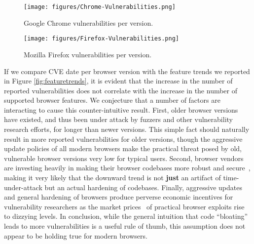 \begin{figure}[ht]
    \centering
    \texttt{[image: figures/Chrome-Vulnerabilities.png]}
    \caption{Google Chrome vulnerabilities per version.}
    \label{fig:chrome-vuln}
\end{figure}

\begin{figure}[ht]
    \centering
    \texttt{[image: figures/Firefox-Vulnerabilities.png]}
    \caption{Mozilla Firefox vulnerabilities per version.}
    \label{fig:firefox-vuln}
\end{figure}


If we compare CVE date per browser version with the feature trends we reported
in Figure \ref{fig:featuretrends}, it is evident that the increase in the
number of reported vulnerabilities does not correlate with the increase in the
number of supported browser features.  We conjecture that a number of factors
are interacting to cause this counter-intuitive result.  First, older browser
versions have existed, and thus been under attack by fuzzers and other
vulnerability research efforts, for longer than newer versions. This simple
fact should naturally result in more reported vulnerabilities for older
versions, though the aggressive update policies of all modern browsers make the
practical threat posed by old, vulnerable browser versions very low for typical
users.  Second, browser vendors are investing heavily in making their browser
codebases more robust and secure~\cite{FirefoxCrashes,ChromeSecure}, making it
very likely that the downward trend is not \textbf{just} an artifact of
time-under-attack but an actual hardening of codebases.  Finally, aggressive
updates and general hardening of browsers produce perverse economic incentives
for vulnerability researchers as the market
prices~\cite{noauthor_zerodium_nodate} of practical browser exploits rise to
dizzying levels. In conclusion, while the general intuition that code
``bloating'' leads to more vulnerabilities is a useful rule of thumb, this
assumption does not appear to be holding true for modern browsers.

